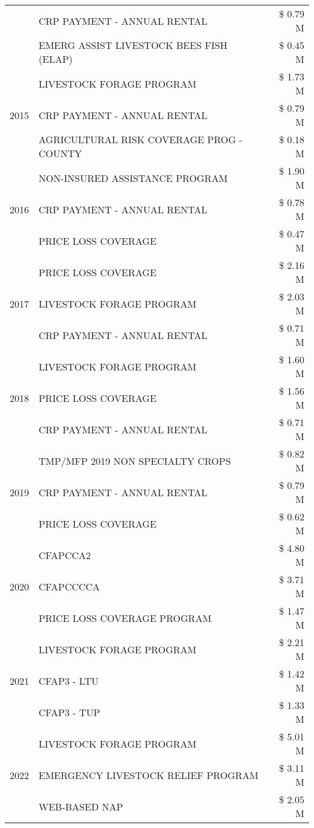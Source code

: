 \begin{tabular}{llr}
 & CRP PAYMENT - ANNUAL RENTAL & \$ 0.79 M \\
 & EMERG ASSIST LIVESTOCK BEES FISH (ELAP) & \$ 0.45 M \\
\cline{1-3}
\multirow[t]{3}{*}{2015} & LIVESTOCK FORAGE PROGRAM & \$ 1.73 M \\
 & CRP PAYMENT - ANNUAL RENTAL & \$ 0.79 M \\
 & AGRICULTURAL RISK COVERAGE PROG - COUNTY & \$ 0.18 M \\
\cline{1-3}
\multirow[t]{3}{*}{2016} & NON-INSURED ASSISTANCE PROGRAM & \$ 1.90 M \\
 & CRP PAYMENT - ANNUAL RENTAL & \$ 0.78 M \\
 & PRICE LOSS COVERAGE & \$ 0.47 M \\
\cline{1-3}
\multirow[t]{3}{*}{2017} & PRICE LOSS COVERAGE & \$ 2.16 M \\
 & LIVESTOCK FORAGE PROGRAM & \$ 2.03 M \\
 & CRP PAYMENT - ANNUAL RENTAL & \$ 0.71 M \\
\cline{1-3}
\multirow[t]{3}{*}{2018} & LIVESTOCK FORAGE PROGRAM & \$ 1.60 M \\
 & PRICE LOSS COVERAGE & \$ 1.56 M \\
 & CRP PAYMENT - ANNUAL RENTAL & \$ 0.71 M \\
\cline{1-3}
\multirow[t]{3}{*}{2019} & TMP/MFP 2019 NON SPECIALTY CROPS & \$ 0.82 M \\
 & CRP PAYMENT - ANNUAL RENTAL & \$ 0.79 M \\
 & PRICE LOSS COVERAGE & \$ 0.62 M \\
\cline{1-3}
\multirow[t]{3}{*}{2020} & CFAPCCA2 & \$ 4.80 M \\
 & CFAPCCCCA & \$ 3.71 M \\
 & PRICE LOSS COVERAGE PROGRAM & \$ 1.47 M \\
\cline{1-3}
\multirow[t]{3}{*}{2021} & LIVESTOCK FORAGE PROGRAM & \$ 2.21 M \\
 & CFAP3 - LTU & \$ 1.42 M \\
 & CFAP3 - TUP & \$ 1.33 M \\
\cline{1-3}
\multirow[t]{3}{*}{2022} & LIVESTOCK FORAGE PROGRAM & \$ 5.01 M \\
 & EMERGENCY LIVESTOCK RELIEF PROGRAM & \$ 3.11 M \\
 & WEB-BASED NAP & \$ 2.05 M \\
\cline{1-3}
\bottomrule
\end{tabular}
